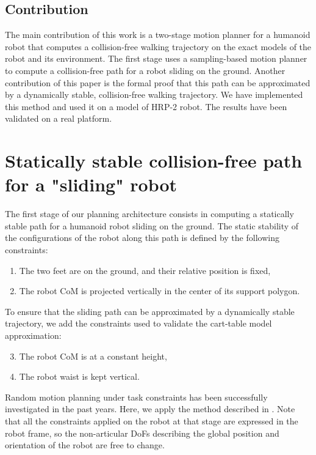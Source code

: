 \documentclass{article}
\begin{document}
\subsection{Contribution}

The main contribution of this work is a two-stage motion planner for a
humanoid robot that computes a collision-free walking trajectory on the
exact models of the robot and its environment. The first stage uses a
sampling-based motion 
planner to  compute a collision-free path  for a robot  sliding on the
ground. Another  contribution of this  paper is the formal  proof that
this path can be  approximated by a dynamically stable, collision-free
walking  trajectory. We have implemented this method and  used it on a
model of  HRP-2 robot.  The results have been  validated on a real
platform.



\section{Statically stable collision-free path for a "sliding" robot}

\label{sec:sliding}

The first stage  of our planning architecture consists  in computing a
statically stable  path for  a humanoid robot  sliding on  the ground.
The static  stability of the configurations of the
robot along this path is defined by the following constraints:
\begin{enumerate}
\item The two  feet are on the ground, and  their relative position is
  fixed,
\item The robot CoM is projected vertically in  the center of its
  support polygon. 
\end{enumerate}
To ensure that the sliding path  can be approximated by a dynamically
stable  trajectory,  we add the constraints used to validate 
the cart-table model approximation:
\begin{enumerate}
\setcounter{enumi}{2}
\item The robot CoM is at a constant height,
\item The robot waist is kept vertical.
\end{enumerate}

Random  motion planning  under task  constraints has  been successfully
investigated in the past years. Here, we apply the method described in
\cite{dalibard09}. Note  that all the constraints  applied on the  robot at that
stage are  expressed in the  robot frame, so the  non-articular DoFs
describing the global  position and orientation of the  robot are free
to change.
\end{document}
